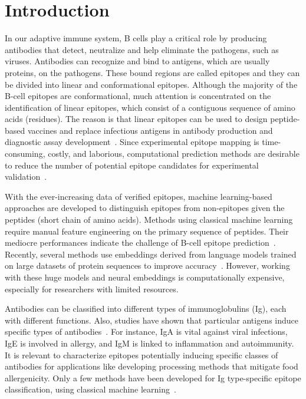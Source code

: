 \documentclass[runningheads]{llncs}
\begin{document}
\section{Introduction}
In our adaptive immune system, B cells play a critical role by producing antibodies that detect, neutralize and help eliminate the pathogens, such as viruses. Antibodies can recognize and bind to antigens, which are usually proteins, on the pathogens. These bound regions are called epitopes and they can be divided into linear and conformational epitopes. Although the majority of the B-cell epitopes are conformational, much attention is concentrated on the identification of linear epitopes, which consist of a contiguous sequence of amino acids (residues). The reason is that linear epitopes can be used to design peptide-based vaccines and replace infectious antigens in antibody production and diagnostic assay development~\cite{potocnakova2016introduction}. Since experimental epitope mapping is time-consuming, costly, and laborious, computational prediction methods are desirable to reduce the number of potential epitope candidates for experimental validation~\cite{sanchez2017fundamentals}.

With the ever-increasing data of verified epitopes, machine learning-based approaches are developed to distinguish epitopes from non-epitopes given the peptides (short chain of amino acids). Methods using classical machine learning require manual feature engineering on the primary sequence of peptides. Their mediocre performances indicate the challenge of B-cell epitope prediction~\cite{galanis2021linear}. Recently, several methods use embeddings derived from language models trained on large datasets of protein sequences to improve accuracy~\cite{bahai2021epitopevec,clifford2022bepipred,collatz2021epidope}. However, working with these huge models and neural embeddings is computationally expensive, especially for researchers with limited resources.

Antibodies can be classified into different types of immunoglobulins (Ig), each with different functions. Also, studies have shown that particular antigens induce specific types of antibodies~\cite{kuby}. For instance, IgA is vital against viral infections, IgE is involved in allergy, and IgM is linked to inflammation and autoimmunity. It is relevant to characterize epitopes potentially inducing specific classes of antibodies for applications like developing processing methods that mitigate food allergenicity. Only a few methods have been developed for Ig type-specific epitope classification, using classical machine learning~\cite{gupta2013identification,kadam2021antibody}.
\end{document}
